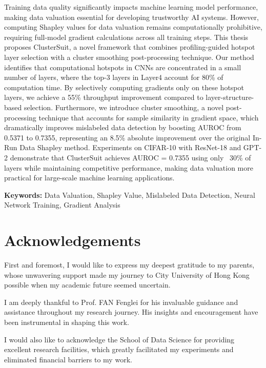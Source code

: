 \documentclass[12pt,a4paper]{report}
\begin{document}
Training data quality significantly impacts machine learning model performance, making data valuation essential for developing trustworthy AI systems. However, computing Shapley values for data valuation remains computationally prohibitive, requiring full-model gradient calculations across all training steps. This thesis proposes ClusterSuit, a novel framework that combines profiling-guided hotspot layer selection with a cluster smoothing post-processing technique. Our method identifies that computational hotspots in CNNs are concentrated in a small number of layers, where the top-3 layers in Layer4 account for 80\% of computation time. By selectively computing gradients only on these hotspot layers, we achieve a 55\% throughput improvement compared to layer-structure-based selection. Furthermore, we introduce cluster smoothing, a novel post-processing technique that accounts for sample similarity in gradient space, which dramatically improves mislabeled data detection by boosting AUROC from 0.5371 to 0.7355, representing an 8.5\% absolute improvement over the original In-Run Data Shapley method. Experiments on CIFAR-10 with ResNet-18 and GPT-2 demonstrate that ClusterSuit achieves AUROC = 0.7355 using only ~30\% of layers while maintaining competitive performance, making data valuation more practical for large-scale machine learning applications.

\bigskip
\noindent\textbf{Keywords:} Data Valuation, Shapley Value, Mislabeled Data Detection, Neural Network Training, Gradient Analysis

\vfill
\newpage

\section*{Acknowledgements}
\bigskip

First and foremost, I would like to express my deepest gratitude to my parents, whose unwavering support made my journey to City University of Hong Kong possible when my academic future seemed uncertain.

\bigskip
I am deeply thankful to Prof. FAN Fenglei for his invaluable guidance and assistance throughout my research journey. His insights and encouragement have been instrumental in shaping this work.

\bigskip
I would also like to acknowledge the School of Data Science for providing excellent research facilities, which greatly facilitated my experiments and eliminated financial barriers to my work.
\end{document}
